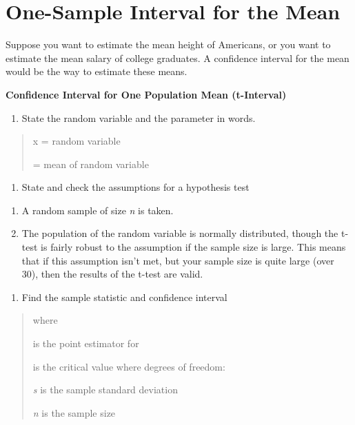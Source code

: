 \documentclass[]{book}
\providecommand{\tightlist}{%
  \setlength{\itemsep}{0pt}\setlength{\parskip}{0pt}}
\begin{document}
\hypertarget{one-sample-interval-for-the-mean}{%
\section{One-Sample Interval for the Mean}\label{one-sample-interval-for-the-mean}}

Suppose you want to estimate the mean height of Americans, or you want to estimate the mean salary of college graduates. A confidence interval for the mean would be the way to estimate these means.

\textbf{Confidence Interval for One Population Mean (t-Interval)}

\begin{enumerate}
\def\labelenumi{\arabic{enumi}.}
\tightlist
\item
  State the random variable and the parameter in words.
\end{enumerate}

\begin{quote}
x = random variable

= mean of random variable
\end{quote}

\begin{enumerate}
\def\labelenumi{\arabic{enumi}.}
\setcounter{enumi}{1}
\tightlist
\item
  State and check the assumptions for a hypothesis test
\end{enumerate}

\begin{enumerate}
\def\labelenumi{\alph{enumi}.}
\item
  A random sample of size \emph{n} is taken.
\item
  The population of the random variable is normally distributed, though the t-test is fairly robust to the assumption if the sample size is large. This means that if this assumption isn't met, but your sample size is quite large (over 30), then the results of the t-test are valid.
\end{enumerate}

\begin{enumerate}
\def\labelenumi{\arabic{enumi}.}
\setcounter{enumi}{2}
\tightlist
\item
  Find the sample statistic and confidence interval
\end{enumerate}

\begin{quote}
where

is the point estimator for

is the critical value where degrees of freedom:

\emph{s} is the sample standard deviation

\emph{n} is the sample size
\end{quote}
\end{document}
